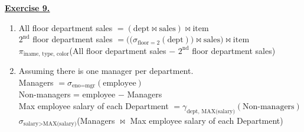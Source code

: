\documentclass[12pt]{article}
\begin{document}
\newpage
\noindent \hyperlink{toc}{\hypertarget{9}{\LARGE \underline{\textbf{Exercise 9.}}}}
\begin{enumerate}
    \item All floor department sales $=(\text{dept}\Join \text{sales}) \Join \text{item}$\\
          $2^{\text{nd}}$ floor department sales $=\Big(\big(\sigma_{\text{floor}=2}(\text{dept})\big)\Join \text{sales}\Big) \Join \text{item}$\\
          $\pi_{\text{iname, type, color}}$(All floor department sales $-$ $2^{\text{nd}}$ floor department sales)
    \item  Assuming there is one manager per department.\\
          Managers $= \sigma_{\text{eno}=\text{mgr}}(\text{employee})$\\
          Non-managers = employee $-$ Managers\\
          Max employee salary of each Department $=\gamma_{\text{dept, MAX(salary)}}(\text{Non-managers}) $\\
          $\sigma_{\text{salary}>\text{MAX(salary)}}$(Managers $\Join$ Max employee salary of each Department)\\


\end{enumerate}
\end{document}
